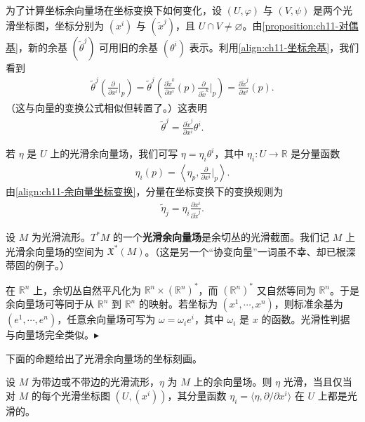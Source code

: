 \documentclass[../../main.tex]{subfiles}
\begin{document}
为了计算坐标余向量场在坐标变换下如何变化，设 $(U,\varphi)$ 与 $(V,\psi)$ 是两个光滑坐标图，坐标分别为 $(x^i)$ 与 $(\tilde x^j)$，且 $U\cap V\neq\varnothing$。由\cref{proposition:ch11-对偶基}，新的余基 $(\tilde\theta^j)$ 可用旧的余基 $(\theta^i)$ 表示。利用\eqref{align:ch11-坐标余基}，我们看到
\begin{align*}
\tilde\theta^j\left(\frac{\partial}{\partial x^i}\bigg|_p\right)=\tilde\theta^j\left(\frac{\partial\tilde x^k}{\partial x^i}(p)\frac{\partial}{\partial\tilde x^k}\bigg|_p\right)=\frac{\partial\tilde x^j}{\partial x^i}(p).
\end{align*}
（这与向量的变换公式相似但转置了。）这表明
\begin{align}
\tilde\theta^j=\frac{\partial\tilde x^j}{\partial x^i}\theta^i.\label{align:ch11-余向量坐标变换}
\end{align}

若 $\eta$ 是 $U$ 上的光滑余向量场，我们可写 $\eta=\eta_i\theta^i$，其中 $\eta_i\colon U\to\mathbb{R}$ 是分量函数
\begin{align*}
\eta_i(p)=\left\langle\eta_p,\frac{\partial}{\partial x^i}\bigg|_p\right\rangle.
\end{align*}
由\eqref{align:ch11-余向量坐标变换}，分量在坐标变换下的变换规则为
\begin{align*}
\tilde\eta_j=\eta_i\frac{\partial x^i}{\partial\tilde x^j}.
\end{align*}

设 $M$ 为光滑流形。$T^*M$ 的一个\textbf{光滑余向量场}是余切丛的光滑截面。我们记 $M$ 上光滑余向量场的空间为 $\mathfrak X^*(M)$。（这是另一个“协变向量”一词虽不幸、却已根深蒂固的例子。）

\begin{example}\label{example:ch11-余向量场例子}
在 $\mathbb{R}^n$ 上，余切丛自然平凡化为 $\mathbb{R}^n\times(\mathbb{R}^n)^*$，而 $(\mathbb{R}^n)^*$ 又自然等同为 $\mathbb{R}^n$。于是余向量场可等同于从 $\mathbb{R}^n$ 到 $\mathbb{R}^n$ 的映射。若坐标为 $(x^1,\cdots ,x^n)$，则标准余基为 $(e^1,\cdots ,e^n)$，任意余向量场可写为 $\omega=\omega_i e^i$，其中 $\omega_i$ 是 $x$ 的函数。光滑性判据与向量场完全类似。$\blacktriangleright$
\end{example}

下面的命题给出了光滑余向量场的坐标刻画。

\begin{proposition}[光滑余向量场的坐标判别法]\label{proposition:ch11-光滑余向量场坐标判别}
设 $M$ 为带边或不带边的光滑流形，$\eta$ 为 $M$ 上的余向量场。则 $\eta$ 光滑，当且仅当对 $M$ 的每个光滑坐标图 $(U,(x^i))$，其分量函数 $\eta_i=\langle\eta,\partial/\partial x^i\rangle$ 在 $U$ 上都是光滑的。
\end{proposition}
\end{document}
